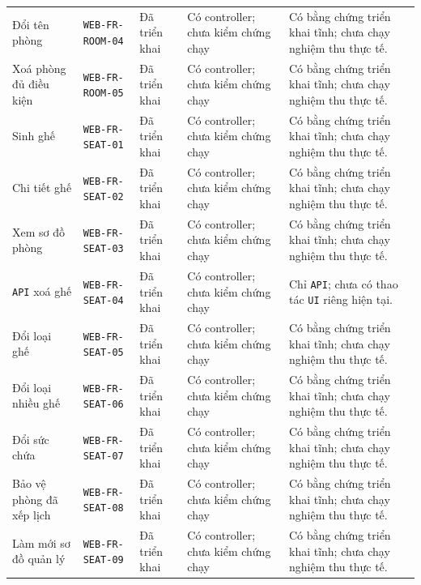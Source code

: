 \begin{longtable}{@{}P{0.19000\SRSWidth}P{0.18000\SRSWidth}P{0.15000\SRSWidth}P{0.20000\SRSWidth}P{0.28000\SRSWidth}@{}}
Đổi tên phòng & \texttt{WEB-\allowbreak{}FR-\allowbreak{}ROOM-\allowbreak{}04} & Đã triển khai & Có controller; chưa kiểm chứng chạy & Có bằng chứng triển khai tĩnh; chưa chạy nghiệm thu thực tế. \\[3pt]
Xoá phòng đủ điều kiện & \texttt{WEB-\allowbreak{}FR-\allowbreak{}ROOM-\allowbreak{}05} & Đã triển khai & Có controller; chưa kiểm chứng chạy & Có bằng chứng triển khai tĩnh; chưa chạy nghiệm thu thực tế. \\[3pt]
Sinh ghế & \texttt{WEB-\allowbreak{}FR-\allowbreak{}SEAT-\allowbreak{}01} & Đã triển khai & Có controller; chưa kiểm chứng chạy & Có bằng chứng triển khai tĩnh; chưa chạy nghiệm thu thực tế. \\[3pt]
Chi tiết ghế & \texttt{WEB-\allowbreak{}FR-\allowbreak{}SEAT-\allowbreak{}02} & Đã triển khai & Có controller; chưa kiểm chứng chạy & Có bằng chứng triển khai tĩnh; chưa chạy nghiệm thu thực tế. \\[3pt]
Xem sơ đồ phòng & \texttt{WEB-\allowbreak{}FR-\allowbreak{}SEAT-\allowbreak{}03} & Đã triển khai & Có controller; chưa kiểm chứng chạy & Có bằng chứng triển khai tĩnh; chưa chạy nghiệm thu thực tế. \\[3pt]
\texttt{API} xoá ghế & \texttt{WEB-\allowbreak{}FR-\allowbreak{}SEAT-\allowbreak{}04} & Đã triển khai & Có controller; chưa kiểm chứng chạy & Chỉ \texttt{API}; chưa có thao tác \texttt{UI} riêng hiện tại. \\[3pt]
Đổi loại ghế & \texttt{WEB-\allowbreak{}FR-\allowbreak{}SEAT-\allowbreak{}05} & Đã triển khai & Có controller; chưa kiểm chứng chạy & Có bằng chứng triển khai tĩnh; chưa chạy nghiệm thu thực tế. \\[3pt]
Đổi loại nhiều ghế & \texttt{WEB-\allowbreak{}FR-\allowbreak{}SEAT-\allowbreak{}06} & Đã triển khai & Có controller; chưa kiểm chứng chạy & Có bằng chứng triển khai tĩnh; chưa chạy nghiệm thu thực tế. \\[3pt]
Đổi sức chứa & \texttt{WEB-\allowbreak{}FR-\allowbreak{}SEAT-\allowbreak{}07} & Đã triển khai & Có controller; chưa kiểm chứng chạy & Có bằng chứng triển khai tĩnh; chưa chạy nghiệm thu thực tế. \\[3pt]
Bảo vệ phòng đã xếp lịch & \texttt{WEB-\allowbreak{}FR-\allowbreak{}SEAT-\allowbreak{}08} & Đã triển khai & Có controller; chưa kiểm chứng chạy & Có bằng chứng triển khai tĩnh; chưa chạy nghiệm thu thực tế. \\[3pt]
Làm mới sơ đồ quản lý & \texttt{WEB-\allowbreak{}FR-\allowbreak{}SEAT-\allowbreak{}09} & Đã triển khai & Có controller; chưa kiểm chứng chạy & Có bằng chứng triển khai tĩnh; chưa chạy nghiệm thu thực tế. \\[3pt]

\end{longtable}
